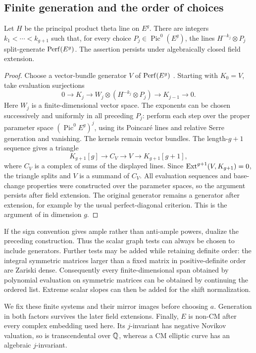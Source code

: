 \subsection{Finite generation and the order of choices}

\begin{lemma}
\label{setup:graph-generation}
Let $H$ be the principal product theta line on $E^g$.  There are
integers $k_1<\cdots<k_{g+1}$ such that, for every choice
$P_j\in\operatorname{Pic}^0(E^g)$, the lines
$H^{-k_j}\otimes P_j$ split-generate $\operatorname{Perf}(E^g)$.
The assertion persists under algebraically closed field extension.
\end{lemma}

\begin{proof}
Choose a vector-bundle generator $V$ of $\operatorname{Perf}(E^g)$
\cite{BondalVanDenBergh}.  Starting with $K_0=V$, take evaluation
surjections
\[
 0\longrightarrow K_j\longrightarrow
 W_j\otimes(H^{-k_j}\otimes P_j)
 \longrightarrow K_{j-1}\longrightarrow0.
\]
Here $W_j$ is a finite-dimensional vector space.  The exponents can be
chosen successively and uniformly in all preceding $P_j$: perform each
step over the proper parameter space
$(\operatorname{Pic}^0 E^g)^j$, using its Poincar\'e lines and relative
Serre generation and vanishing.  The kernels remain vector bundles.
The length-$g+1$ sequence gives a triangle
\[
 K_{g+1}[g]\longrightarrow C_V\longrightarrow V
 \longrightarrow K_{g+1}[g+1],
\]
where $C_V$ is a complex of sums of the displayed lines.  Since
$\operatorname{Ext}^{g+1}(V,K_{g+1})=0$, the triangle splits and $V$ is a summand of
$C_V$.  All evaluation sequences and base-change properties were
constructed over the parameter spaces, so the argument persists after
field extension.  The original generator remains a generator after
extension, for example by the usual perfect-diagonal criterion.
This is the argument of \cite[Lemma~9.3]{A8} in dimension $g$.
\end{proof}

If the sign convention gives ample rather than anti-ample powers,
dualize the preceding construction.  Thus the scalar graph tests can
always be chosen to include generators.  Further tests may be added
while retaining definite order: the integral symmetric matrices larger
than a fixed matrix in positive-definite order are Zariski dense.
Consequently every finite-dimensional span obtained by polynomial
evaluation on symmetric matrices can be obtained by continuing the
ordered list.  Extreme scalar slopes can then be added for the shift
normalization.

We fix these finite systems and their mirror images before choosing
$a$.  Generation in both factors survives the later field extensions.
Finally, $E$ is non-CM after every complex embedding used here.  Its
$j$-invariant has negative Novikov valuation, so is transcendental over
$\mathbb Q$, whereas a CM elliptic curve has an algebraic $j$-invariant.
